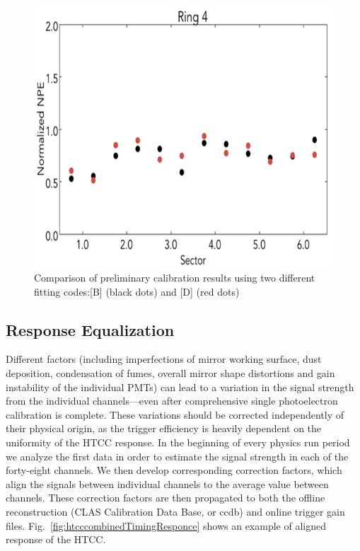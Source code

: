 \begin{figure}[h]
\centering
\includegraphics[width=0.99\linewidth]{images/WILLIAM_4.png}
\caption{Comparison of preliminary calibration results using two different fitting codes:[B] (black dots) and [D] (red dots)}
\label{fig:WILLIAM_4}
\end{figure}

\subsection{Response Equalization} Different factors (including imperfections of mirror working surface, dust deposition, condensation of fumes, overall mirror shape distortions and gain instability of the individual PMTs) can lead to a variation in the signal strength from the individual channels---even after comprehensive single photoelectron calibration is complete. These variations should be corrected independently of their physical origin, as the trigger efficiency is heavily dependent on the uniformity of the HTCC response. In the beginning of every physics run period we analyze the first data in order to estimate the signal strength in each of the forty-eight channels. We then develop corresponding correction factors, which align the signals between individual channels to the average value between channels. These correction factors are then propagated to both the offline reconstruction (CLAS Calibration Data Base, or ccdb) and online trigger gain files. Fig.~\ref{fig:htcccombinedTimingResponce} shows an example of aligned response of the HTCC.

